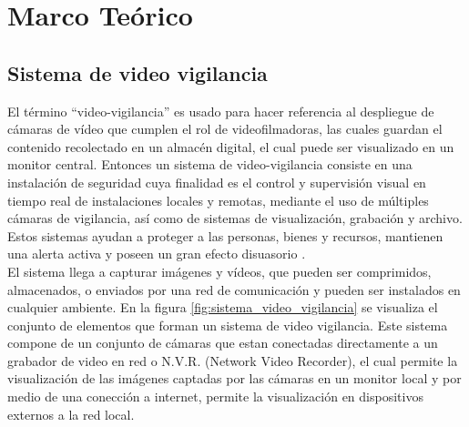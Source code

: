 \chapter{Marco Teórico}


\section{Sistema de video vigilancia}
El término ``video-vigilancia'' es usado para hacer referencia al despliegue de cámaras de vídeo que cumplen el rol de videofilmadoras, las cuales guardan el contenido recolectado en un almacén digital, el cual puede ser visualizado en un monitor central. Entonces un sistema de video-vigilancia consiste en una instalación de seguridad cuya finalidad es el control y supervisión visual en tiempo real de instalaciones locales y remotas, mediante el uso de múltiples cámaras de vigilancia, así como de sistemas de visualización, grabación y archivo. Estos sistemas ayudan a proteger a las personas, bienes y recursos, mantienen una alerta activa y poseen un gran efecto disuasorio \cite{wikipedia:vvigilancia}.\\

El sistema llega a capturar imágenes y vídeos, que pueden ser comprimidos, almacenados, o enviados por una red de comunicación y pueden ser instalados en cualquier ambiente. En la figura \ref{fig:sistema_video_vigilancia} se visualiza el conjunto de elementos que forman un sistema de video vigilancia. Este sistema compone de un conjunto de cámaras que estan conectadas directamente a un grabador de video en red o N.V.R. (Network Video Recorder), el cual permite la visualización de las imágenes captadas por las cámaras en un monitor local y por medio de una conección a internet, permite la visualización en dispositivos externos a la red local.\\

